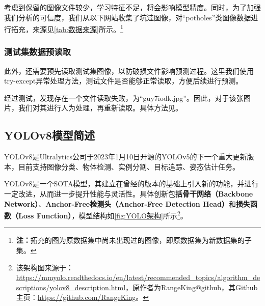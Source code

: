 \documentclass{MathorCupmodeling}
\begin{document}
	考虑到保留的图像文件较少，学习特征不足，将会影响模型精度。同时，为了加强我们分析的可信度，我们从以下网站收集了坑洼图像，对“potholes”类图像数据进行拓充，来源见\textcolor{blue}{\cref{tab:数据来源}}所示。\textcolor{blue}{\footnote{\textbf{注：}拓充的图为原数据集中尚未出现过的图像，即原数据集为新数据集的子集。}}
	\begin{table}[htbp]
		\centering
		\caption{拓充数据来源}
		\label{tab:数据来源}
	  \end{table}
	\subsubsection{测试集数据预读取}\label{预读取}
	此外，还需要预先读取测试集图像，以防破损文件影响预测过程。这里我们使用try-except异常处理方法，测试文件是否能够正常读取，方便后续进行预测。
	
	经过测试，发现存在一个文件读取失败，为“guy7iodk.jpg”。因此，对于该张图片，我们对其进行人为处理，再重新读取。具体方法见\textcolor{blue}{}。
	
	\subsection{YOLOv8模型简述}

	YOLOv8是Ultralytics公司于2023年1月10日开源的YOLOv5的下一个重大更新版本，目前支持图像分类、物体检测、实例分割、目标追踪、姿态估计任务\textcolor{blue}{\cite{YOLO任务}}。

	YOLOv8是一个SOTA模型，其建立在曾经的版本的基础上引入新的功能，并进行一定改进，从而进一步提升性能与灵活性。具体创新包\textbf{括骨干网络（Backbone Network）}、\textbf{Anchor-Free检测头（Anchor-Free Detection Head）}和\textbf{损失函数（Loss Function）}\textcolor{blue}{\cite{YOLO架构}}，模型结构如\textcolor{blue}{\cref{fig:YOLO架构}}所示\textcolor{blue}{\footnote{该架构图来源于：\url{https://mmyolo.readthedocs.io/en/latest/recommended_topics/algorithm_descriptions/yolov8_description.html}，原作者为RangeKing@github，其Github主页：\url{https://github.com/RangeKing}。}}。
\end{document}
